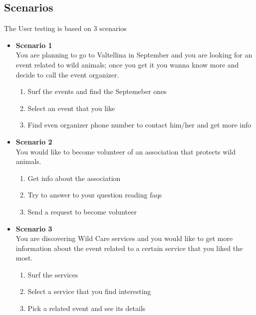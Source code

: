 \subsection{Scenarios}
The User testing is based on 3 scenarios
\begin{itemize}
		\item \textbf{Scenario 1}\\ You are planning to go to Valtellina in September and you are looking for an event related to 				wild animals; once you get it you wanna know more and decide to call the event organizer.
			\begin{enumerate}
				\item Surf the events and find the Septemeber ones
				\item Select an event that you like
				\item Find even organizer phone number to contact him/her and get more info
			\end{enumerate}
		\item \textbf{Scenario 2}\\ You would like to become volunteer of an association that protects wild animals.
			\begin{enumerate}
				\item Get info about the association
				\item Try to answer to your question reading faqs
				\item Send a request to become volunteer
			\end{enumerate}
		\item \textbf{Scenario 3}\\ You are discovering Wild Care services and you would like to get more information about the 			event related to a certain service that you liked the most.
			\begin{enumerate}
				\item Surf the services
				\item Select a service that you find interesting 
				\item Pick a related event and see its details
			\end{enumerate}
\end{itemize}

